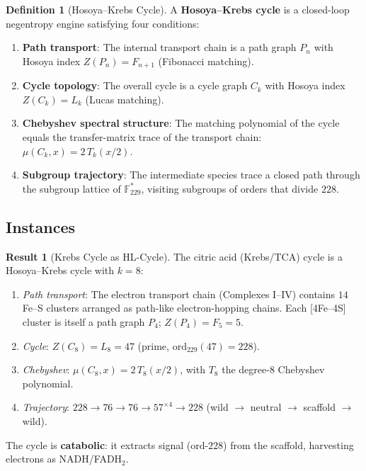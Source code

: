\documentclass[12pt]{article}
\theoremstyle{principia}
\theoremstyle{definition}
\newtheorem{definition}[theorem]{Definition}
\newtheorem{result}[theorem]{Result}
\theoremstyle{remark}
\providecommand{\FF}{\mathbb{F}}
\begin{document}
\begin{definition}[Hosoya--Krebs Cycle]\label{def:hl_cycle}
A \textbf{Hosoya--Krebs cycle} is a closed-loop negentropy engine satisfying four conditions:
\begin{enumerate}[noitemsep, label=(HL\arabic*)]
    \item \textbf{Path transport}: The internal transport chain is a path graph $P_n$ with Hosoya index $Z(P_n) = F_{n+1}$ (Fibonacci matching).
    \item \textbf{Cycle topology}: The overall cycle is a cycle graph $C_k$ with Hosoya index $Z(C_k) = L_k$ (Lucas matching).
    \item \textbf{Chebyshev spectral structure}: The matching polynomial of the cycle equals the transfer-matrix trace of the transport chain: $\mu(C_k, x) = 2\,T_k(x/2)$.
    \item \textbf{Subgroup trajectory}: The intermediate species trace a closed path through the subgroup lattice of\/ $\FF_{229}^*$, visiting subgroups of orders that divide $228$.
\end{enumerate}
\end{definition}

\subsection{Instances}

\begin{result}[Krebs Cycle as HL-Cycle]\label{res:krebs_hl}
The citric acid (Krebs/TCA) cycle is a Hosoya--Krebs cycle with $k = 8$:
\begin{enumerate}[noitemsep]
    \item[(HL1)] \emph{Path transport}: The electron transport chain (Complexes I--IV) contains $14$ Fe--S clusters arranged as path-like electron-hopping chains. Each [4Fe--4S] cluster is itself a path graph $P_4$; $Z(P_4) = F_5 = 5$.
    \item[(HL2)] \emph{Cycle}: $Z(C_8) = L_8 = 47$ (prime, $\mathrm{ord}_{229}(47) = 228$).
    \item[(HL3)] \emph{Chebyshev}: $\mu(C_8, x) = 2\,T_8(x/2)$, with $T_8$ the degree-$8$ Chebyshev polynomial.
    \item[(HL4)] \emph{Trajectory}: $228 \to 76 \to 76 \to 57^{\times 4} \to 228$ (wild $\to$ neutral $\to$ scaffold $\to$ wild).
\end{enumerate}
The cycle is \textbf{catabolic}: it extracts signal (ord-$228$) from the scaffold, harvesting electrons as NADH/FADH$_2$.
\end{result}
\end{document}
